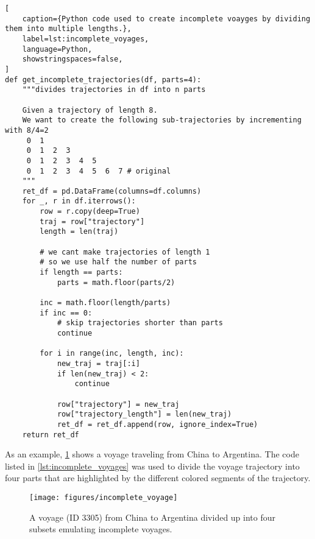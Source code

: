 \begin{lstlisting}[
    caption={Python code used to create incomplete voayges by dividing them into multiple lengths.},
    label=lst:incomplete_voyages,
    language=Python,
    showstringspaces=false,
]
def get_incomplete_trajectories(df, parts=4):
    """divides trajectories in df into n parts

    Given a trajectory of length 8.
    We want to create the following sub-trajectories by incrementing with 8/4=2
     0  1
     0  1  2  3
     0  1  2  3  4  5
     0  1  2  3  4  5  6  7 # original
    """
    ret_df = pd.DataFrame(columns=df.columns)
    for _, r in df.iterrows():
        row = r.copy(deep=True)
        traj = row["trajectory"]
        length = len(traj)

        # we cant make trajectories of length 1
        # so we use half the number of parts
        if length == parts:
            parts = math.floor(parts/2)

        inc = math.floor(length/parts)
        if inc == 0:
            # skip trajectories shorter than parts
            continue

        for i in range(inc, length, inc):
            new_traj = traj[:i]
            if len(new_traj) < 2:
                continue

            row["trajectory"] = new_traj
            row["trajectory_length"] = len(new_traj)
            ret_df = ret_df.append(row, ignore_index=True)
    return ret_df
\end{lstlisting}

As an example, \cref{fig:incomplete_voyage} shows a voyage traveling from China to Argentina. The code listed in \cref{lst:incomplete_voyages} was used to divide the voyage trajectory into four parts that are highlighted by the different colored segments of the trajectory.

\noindent
\begin{figure}[htbp]
    \texttt{[image: figures/incomplete\_voyage]}
    \caption{A voyage (ID 3305) from China to Argentina divided up into four subsets emulating incomplete voyages.}
    \label{fig:incomplete_voyage}
\end{figure}

